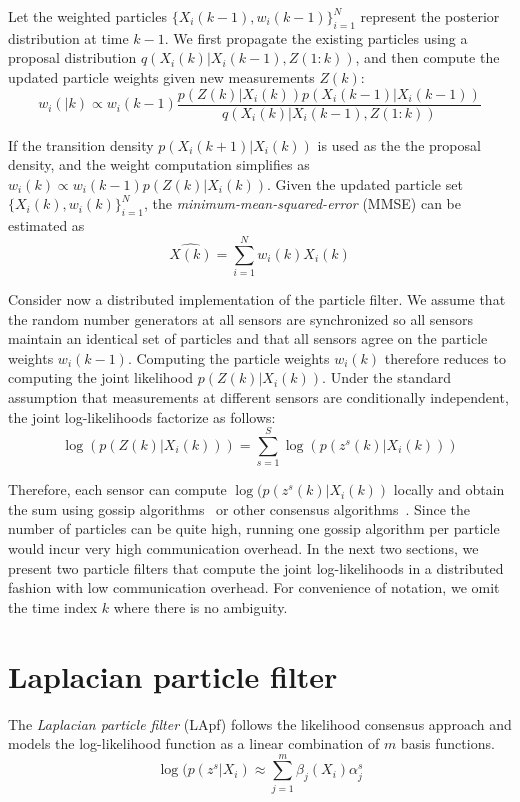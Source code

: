 \documentclass[10pt,letterpaper,final]{article}
\begin{document}
Let the weighted particles $\{X_i(k-1),w_i(k-1) \}_{i=1}^N$ represent the posterior distribution at time $k-1$. We first propagate the existing particles using a proposal distribution $q(X_i(k)|X_i(k-1), Z(1:k))$, and then compute the updated particle weights given new measurements $Z(k)$:
\begin{equation}
w_i(|k) \propto w_i(k-1)\frac{p(Z(k)|X_i(k))p(X_i(k-1)|X_i(k-1))}{q(X_i(k)|X_i(k-1), Z(1:k))}
\end{equation}

If the transition density $p(X_i(k+1)|X_i(k))$ is used as the the proposal density, and the weight computation simplifies as $w_i(k) \propto w_i(k-1)p(Z(k)|X_i(k))$. Given the updated particle set $\{ X_i(k), w_i(k)\}_{i=1}^N$, the \textit{minimum-mean-squared-error} (MMSE) can be estimated as
\begin{equation}
\hat{X(k)} = \sum_{i=1}^N w_i(k)X_i(k)
\end{equation}

Consider now a distributed implementation of the particle filter. We assume that the random number generators at all sensors are synchronized so all sensors maintain an identical set of particles and that all sensors agree on the particle weights $w_i(k-1)$. Computing the particle weights $w_i(k)$ therefore reduces to computing the joint likelihood $p(Z(k)|X_i(k))$. Under the standard assumption that measurements at different sensors are conditionally independent, the joint log-likelihoods factorize as follows:
\begin{equation}
\log(p(Z(k)|X_i(k))) = \sum_{s=1}^S \log(p(z^s(k)|X_i(k)))
\end{equation}

Therefore, each sensor can compute $\log(p(z^s(k)|X_i(k))$ locally and obtain the sum using gossip algorithms~\cite{Boyd2006, Ustebay2011Gossip} or other consensus algorithms~\cite{Xiao2005}. Since the number of particles can be quite high, running one gossip algorithm per particle would incur very high communication overhead. In the next two sections, we present two particle filters that compute the joint log-likelihoods in a distributed fashion with low communication overhead. For convenience of notation, we omit the time index $k$ where there is no ambiguity. 

\section{Laplacian particle filter}
The \textit{Laplacian particle filter} (LApf) follows the likelihood consensus approach and models the log-likelihood function as a linear combination of $m$ basis functions. 
\begin{equation}
\log (p(z^s|X_i) \approx \sum_{j=1}^m \beta_j(X_i)\alpha_j^s
\end{equation}
\end{document}
